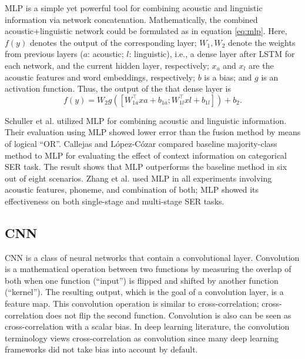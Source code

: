 MLP is a simple yet powerful tool for combining acoustic and linguistic
information via network concatenation. Mathematically, the combined
acoustic+linguistic network could be formulated as in equation \ref{eq:mlp}.
Here, $f(y)$ denotes the output of the corresponding layer; $W_1, W_2$ denote
the weights from previous layers ($a$: acoustic; $l$: linguistic), i.e., a dense
layer after LSTM for each network, and the current hidden layer, respectively;
$x_a$ and $x_l$ are the acoustic features and word embeddings, respectively;
$b$ is a bias; and $g$ is an activation function. Thus, the output of the that
dense layer is 
\begin{equation}
f(y) = W_2 g ([W_{1a}^\top xa + b_{1a};W_{1l}^\top xl + b_{1l}]) + b_2
\label{eq:mlp}.
\end{equation}

Schuller et al. \cite{Schuller2004} utilized MLP for combining acoustic and
linguistic information. Their evaluation using MLP showed lower error than the
fusion method by means of logical ``OR''. Callejas and L\'opez-C\'ozar
\cite{Callejas2008} compared baseline majority-class method to MLP for
evaluating the effect of context information on categorical SER task. The
result shows that MLP outperforms the baseline method in six out of eight
scenarios. Zhang et al.  \cite{Zhang2019} used MLP in all experiments involving
acoustic features, phoneme, and combination of both; MLP showed its
effectiveness on both single-stage and multi-stage SER tasks.


\subsection{CNN}
CNN is a class of neural networks that contain a convolutional layer.
Convolution is a mathematical operation between two functions by measuring the
overlap of both when one function (``input'') is flipped and shifted by another
function (``kernel''). The resulting output, which is the goal of a convolution
layer, is a feature map. This convolution operation is similar to
cross-correlation; cross-correlation does not flip the second function.
Convolution is also can be seen as cross-correlation with a scalar bias. In
deep learning literature, the convolution terminology views cross-correlation
as convolution since many deep learning frameworks did not take bias into
account by default. 

